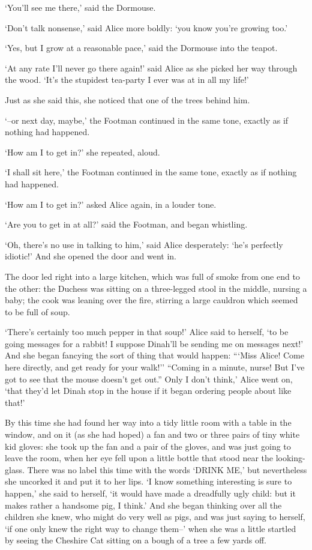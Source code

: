 \documentclass[statementpaper,twoside,openany]{memoir}
\begin{document}
`You'll see me there,' said the Dormouse.

`Don't talk nonsense,' said Alice more boldly: `you know you're growing too.'

`Yes, but I grow at a reasonable pace,' said the Dormouse into the teapot.

`At any rate I'll never go there again!' said Alice as she picked her way through the wood. `It's the stupidest tea-party I ever was at in all my life!'

Just as she said this, she noticed that one of the trees behind him.

`--or next day, maybe,' the Footman continued in the same tone, exactly as if nothing had happened.

`How am I to get in?' she repeated, aloud.

`I shall sit here,' the Footman continued in the same tone, exactly as if nothing had happened.

`How am I to get in?' asked Alice again, in a louder tone.

`Are you to get in at all?' said the Footman, and began whistling.

`Oh, there's no use in talking to him,' said Alice desperately: `he's perfectly idiotic!' And she opened the door and went in.

The door led right into a large kitchen, which was full of smoke from one end to the other: the Duchess was sitting on a three-legged stool in the middle, nursing a baby; the cook was leaning over the fire, stirring a large cauldron which seemed to be full of soup.

`There's certainly too much pepper in that soup!' Alice said to herself, `to be going messages for a rabbit! I suppose Dinah'll be sending me on messages next!' And she began fancying the sort of thing that would happen: ```Miss Alice! Come here directly, and get ready for your walk!'' ``Coming in a minute, nurse! But I've got to see that the mouse doesn't get out.'' Only I don't think,' Alice went on, `that they'd let Dinah stop in the house if it began ordering people about like that!'

By this time she had found her way into a tidy little room with a table in the window, and on it (as she had hoped) a fan and two or three pairs of tiny white kid gloves: she took up the fan and a pair of the gloves, and was just going to leave the room, when her eye fell upon a little bottle that stood near the looking-glass. There was no label this time with the words `DRINK ME,' but nevertheless she uncorked it and put it to her lips. `I know something interesting is sure to happen,' she said to herself, `it would have made a dreadfully ugly child: but it makes rather a handsome pig, I think.' And she began thinking over all the children she knew, who might do very well as pigs, and was just saying to herself, `if one only knew the right way to change them--' when she was a little startled by seeing the Cheshire Cat sitting on a bough of a tree a few yards off.
\end{document}
